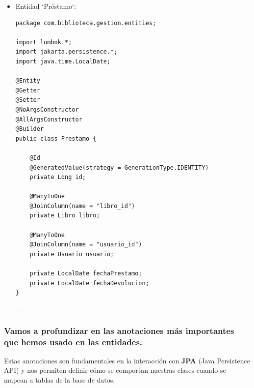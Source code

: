 \documentclass[11pt]{article}
\begin{document}
\begin{itemize}
\item Entidad `Préstamo`:
\label{sec:orgf9a92b6}

\begin{verbatim}
package com.biblioteca.gestion.entities;

import lombok.*;
import jakarta.persistence.*;
import java.time.LocalDate;

@Entity
@Getter
@Setter
@NoArgsConstructor
@AllArgsConstructor
@Builder
public class Prestamo {

    @Id
    @GeneratedValue(strategy = GenerationType.IDENTITY)
    private Long id;

    @ManyToOne
    @JoinColumn(name = "libro_id")
    private Libro libro;

    @ManyToOne
    @JoinColumn(name = "usuario_id")
    private Usuario usuario;

    private LocalDate fechaPrestamo;
    private LocalDate fechaDevolucion;
}
\end{verbatim}

---
\end{itemize}


\subsubsection{Vamos a profundizar en las anotaciones más importantes que hemos usado en las \textbf{\textbf{entidades}}.}
\label{sec:orge186382}
Estas anotaciones son fundamentales en la interacción con \textbf{\textbf{JPA}} (Java Persistence API) y nos permiten definir cómo se comportan nuestras clases cuando se mapean a tablas de la base de datos.
\end{document}
